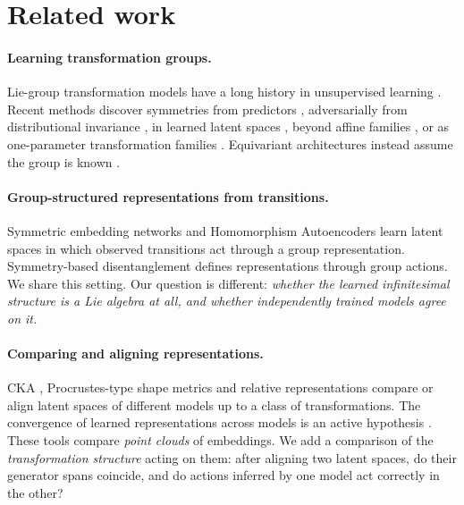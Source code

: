 \section{Related work}\label{sec:related}
\paragraph{Learning transformation groups.}
Lie-group transformation models have a long history in unsupervised learning
\citep{rao1999learning,sohl2010unsupervised,cohen2014learning}. Recent methods discover symmetries from
predictors \citep{dehmamy2021automatic}, adversarially from distributional invariance \citep{yang2023generative},
in learned latent spaces \citep{yang2024latent}, beyond affine families \citep{shaw2024symmetry}, or as
one-parameter transformation families \citep{gabel2023learning}. Equivariant architectures instead assume the
group is known \citep{cohen2016group,bronstein2021geometric}.

\paragraph{Group-structured representations from transitions.}
Symmetric embedding networks \citep{park2022learning} and Homomorphism Autoencoders \citep{keurti2023homomorphism}
learn latent spaces in which observed transitions act through a group representation. Symmetry-based
disentanglement \citep{higgins2018towards} defines representations through group actions. We share this setting.
Our question is different: \emph{whether the learned infinitesimal structure is a Lie algebra at all, and
whether independently trained models agree on it.}

\paragraph{Comparing and aligning representations.}
CKA \citep{kornblith2019similarity}, Procrustes-type shape metrics \citep{williams2021generalized} and relative
representations \citep{moschella2023relative} compare or align latent spaces of different models up to a class of
transformations. The convergence of learned representations across models is an active hypothesis
\citep{huh2024platonic}. These tools compare \emph{point clouds} of embeddings. We add a comparison of the
\emph{transformation structure} acting on them: after aligning two latent spaces, do their generator spans
coincide, and do actions inferred by one model act correctly in the other?
